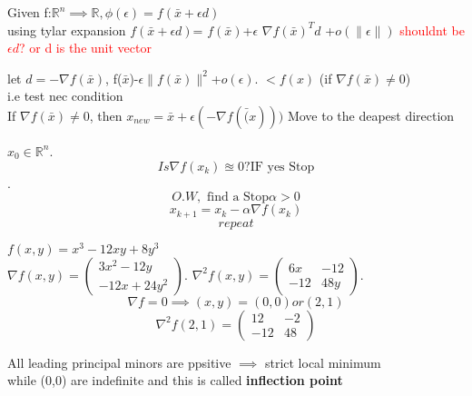 \begin{problem}
    Given f:$\mathbb{R}^n \implies \mathbb{R}, \phi(\epsilon)=f(\bar{x}+\epsilon d)$ 
    \\ using tylar expansion 
    $f(\bar{x}+\epsilon d)$=
    $f(\bar{x})$+$\epsilon$ $\nabla f(\bar{x})^T d$ +$o(\|\epsilon\|)$ \textcolor{red}{shouldnt be $\epsilon d$? or d is the unit vector}

    let $d=-\nabla f(\bar{x})$, f($\bar{x}$)-$\epsilon \| f(\bar{x})\|^2$+$o(\epsilon)$.
    $<f(x)$ (if $\nabla f(\bar{x})\neq 0$)
    \\ i.e test nec condition 
    \\ If $\nabla f(\bar{x})\neq 0$, then $x_{new}=\bar{x}+\epsilon(-\nabla f(\bar(x)))$
    Move to the deapest direction


    
\end{problem}

\begin{definition}
    $x_{0} \in \mathbb{R}^n$.   
    $$Is \nabla f(x_k)\approxeq 0?\text{IF yes Stop}$$.
    $$O.W, \text{ find a Stop} \alpha >0$$
    $$x_{k+1}=x_k-\alpha\nabla f(x_k)$$
    $$repeat$$
\end{definition}

\begin{problem}
    $f(x,y)=x^3-12xy+8y^3$ \\
    $\nabla f(x,y)=\begin{pmatrix}
        3x^2-12y \\
        -12x+24y^2
    \end{pmatrix}$. $\nabla^2 f(x,y)=\begin{pmatrix}
        6x & -12 \\
        -12 & 48y
    \end{pmatrix}$.  \\
    $$\nabla f=0 \implies (x,y)=(0,0) or (2,1)$$
    $$\nabla^2 f(2,1)=\begin{pmatrix}
        12 & -2 \\
        -12 & 48
    \end{pmatrix}$$

    All leading principal minors are ppsitive $\implies$ strict local minimum
    \\ while (0,0) are indefinite and this is called \textbf{inflection point}
\end{problem}

% 